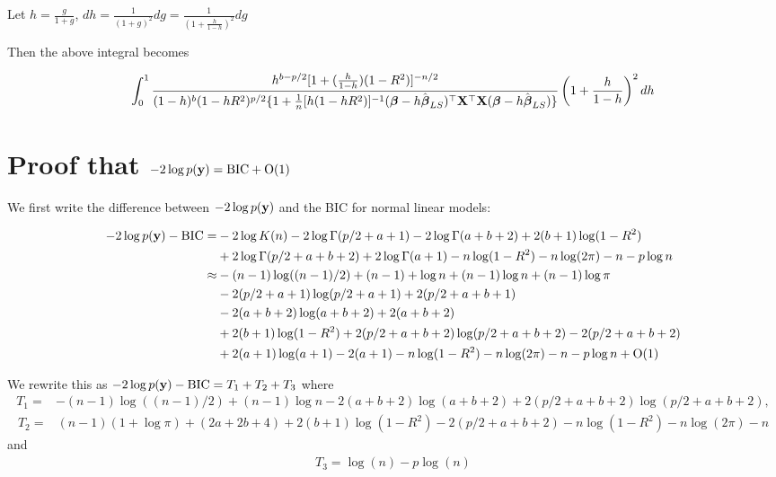 \documentclass{amsart}[12pt]
\theoremstyle{definition}
\begin{document}
Let $h = \frac{g}{1 + g}$, $dh = \frac{1}{(1 + g)^2} dg = \frac{1}{\left(1 + \frac{h}{1 - h}\right)^2} dg$

Then the above integral becomes

\begin{align*}
	\int_0^1 \frac{h^{b - p/2} [1 + (\frac{h}{1 - h})(1 - R^2)]^{-n/2}}{(1 - h)^b (1 - h R^2)^{p/2} \{ 1 + \frac{1}{n}[h(1 - h R^2)]^{-1} ({\boldsymbol \beta} - h \hat{{\boldsymbol \beta}}_{LS})^\top {\bf X}^\top {\bf X} ({\boldsymbol \beta} - h \hat{{\boldsymbol \beta}}_{LS}) \}} \left(1 + \frac{h}{1 - h}\right)^2 dh 
\end{align*}

\section{Proof that $-2 \log p({\bf y}) = \text{BIC} + \text{O}{(1)}$}

We first write the difference between $-2 \log p({\bf y})$ and the BIC for normal linear models:

\begin{align*}
-2 \log p({\bf y}) - \text{BIC} =& -2 \log K(n) - 2 \log \Gamma(p/2 + a + 1) - 2 \log \Gamma(a + b + 2) + 2 (b + 1) \log(1 - R^2) \\
& + 2 \log \Gamma(p/2 + a + b + 2) + 2 \log \Gamma(a + 1) - n \log(1 - R^2) - n \log(2 \pi) - n - p \log n \\
\approx&-(n-1) \log((n-1)/2) + (n - 1) + \log n + (n - 1) \log n + (n - 1) \log \pi \\
&-2(p/2 + a + 1) \log(p/2 + a + 1) + 2(p/2 + a + b + 1) \\
&-2(a + b + 2) \log (a + b + 2) + 2(a + b + 2) \\
&+2(b + 1) \log(1 - R^2) + 2(p/2 + a + b + 2) \log(p/2 + a + b + 2) - 2(p/2 + a + b + 2) \\
&+2(a + 1)\log(a + 1) - 2(a + 1) - n \log(1 - R^2) - n \log(2 \pi) - n - p \log n + \text{O}(1)
\end{align*}

We rewrite this as $-2 \log p({\bf y}) - \text{BIC} = T_1 + T_2 + T_3$ where
\begin{align*}
T_1=&-(n - 1) \log((n-1)/2) + (n - 1) \log n - 2(a + b + 2) \log(a + b + 2) + 2(p/2 + a + b + 2) \log(p/2 + a + b + 2),
\end{align*}
\begin{align*}
T_2=&(n - 1)(1 + \log \pi) + (2a + 2b + 4) + 2(b + 1)\log(1 - R^2) - 2(p/2 + a + b + 2) -n \log(1 - R^2) - n \log(2 \pi) - n
\end{align*}
and
\begin{align*}
T_3 = \log(n) - p \log(n)
\end{align*}
\end{document}
